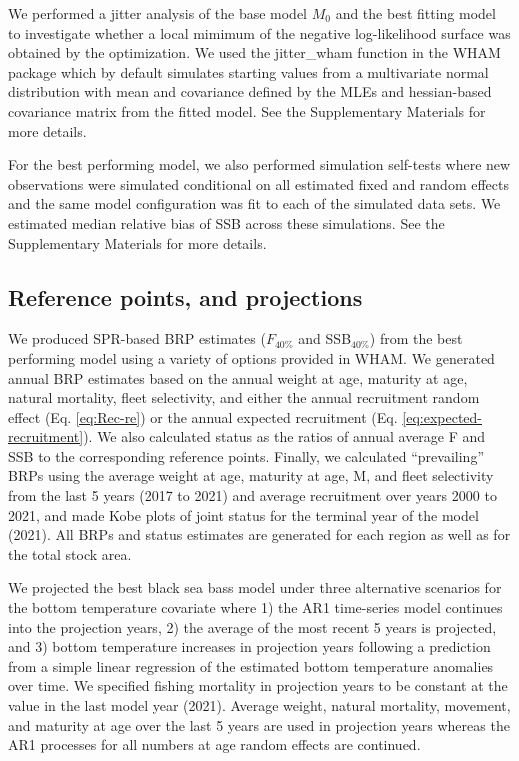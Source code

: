 \documentclass[
]{article}
\begin{document}
We performed a jitter analysis of the base model \(M_0\) and the best fitting model to investigate whether a local mimimum of the negative log-likelihood surface was obtained by the optimization. We used the jitter\_wham function in the WHAM package which by default simulates starting values from a multivariate normal distribution with mean and covariance defined by the MLEs and hessian-based covariance matrix from the fitted model. See the Supplementary Materials for more details.

For the best performing model, we also performed simulation self-tests where new observations were simulated conditional on all estimated fixed and random effects and the same model configuration was fit to each of the simulated data sets. We estimated median relative bias of SSB across these simulations. See the Supplementary Materials for more details.

\hypertarget{reference-points-and-projections}{%
\subsection*{Reference points, and projections}\label{reference-points-and-projections}}

We produced SPR-based BRP estimates (\(F_{40\%}\) and SSB\(_{40\%}\)) from the best performing model using a variety of options provided in WHAM. We generated annual BRP estimates based on the annual weight at age, maturity at age, natural mortality, fleet selectivity, and either the annual recruitment random effect (Eq. \ref{eq:Rec-re}) or the annual expected recruitment (Eq. \ref{eq:expected-recruitment}). We also calculated status as the ratios of annual average F and SSB to the corresponding reference points. Finally, we calculated ``prevailing'' BRPs using the average weight at age, maturity at age, M, and fleet selectivity from the last 5 years (2017 to 2021) and average recruitment over years 2000 to 2021, and made Kobe plots of joint status for the terminal year of the model (2021). All BRPs and status estimates are generated for each region as well as for the total stock area.

We projected the best black sea bass model under three alternative scenarios for the bottom temperature covariate where 1) the AR1 time-series model continues into the projection years, 2) the average of the most recent 5 years is projected, and 3) bottom temperature increases in projection years following a prediction from a simple linear regression of the estimated bottom temperature anomalies over time. We specified fishing mortality in projection years to be constant at the value in the last model year (2021). Average weight, natural mortality, movement, and maturity at age over the last 5 years are used in projection years whereas the AR1 processes for all numbers at age random effects are continued.
\end{document}
